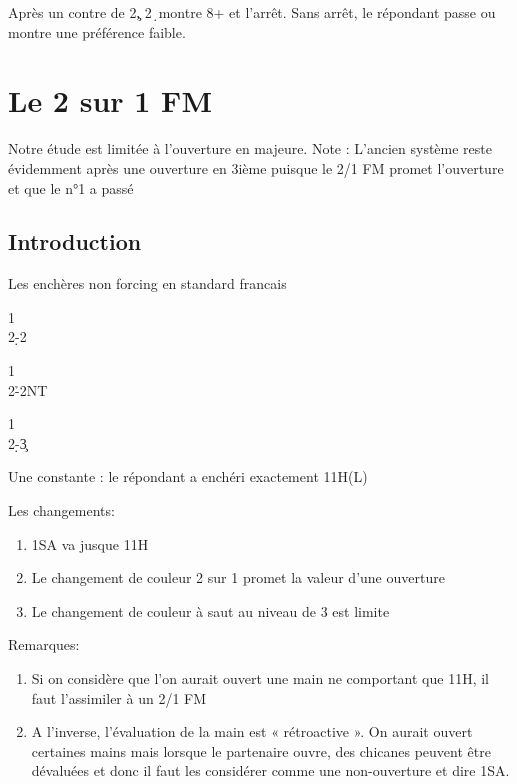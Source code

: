\documentclass[a4paper]{article}
\begin{document}
Après un contre de 2\c , 2\d\ montre 8+ et l'arrêt. Sans arrêt, le répondant passe ou montre une préférence faible.

\section{Le 2 sur 1 FM}

Notre étude est limitée à l’ouverture en majeure. 
Note : 
L’ancien système reste évidemment après une ouverture en 3ième puisque le 2/1 FM promet 
l’ouverture et que le n°1 a passé

\subsection{Introduction}

Les enchères non forcing en standard francais

\begin{bidtable}
1\c\\
2\d-2\s
\end{bidtable}

\begin{bidtable}
1\c\\
2\h-2NT
\end{bidtable}

\begin{bidtable}
1\c\\
2\d-3\c
\end{bidtable}

Une constante : le répondant a enchéri exactement 11H(L)

Les changements:

\begin{enumerate}
\item 1SA va jusque 11H

\item Le changement de couleur 2 sur 1 promet la valeur d’une ouverture

\item Le changement de couleur à saut au niveau de 3 est limite

\end{enumerate}

Remarques:

\begin{enumerate}
\item Si on considère que l’on aurait ouvert une main ne comportant que 11H, il faut 
l’assimiler à un 2/1 FM

\item A l’inverse, l’évaluation de la main est « rétroactive ». On aurait ouvert certaines mains 
mais lorsque le partenaire ouvre, des chicanes peuvent être dévaluées et donc il faut les 
considérer comme une non-ouverture et dire 1SA.

\end{enumerate}
\end{document}

